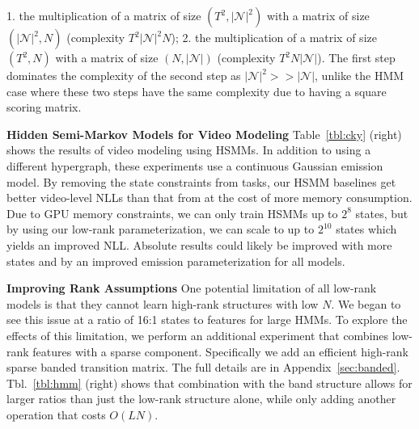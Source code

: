 \documentclass{article}
\begin{document}
1. the multiplication of a matrix of size $(T^2,|\mathcal{N}|^2)$ with a matrix of size $(|\mathcal{N}|^2, N)$ (complexity $T^2|\mathcal{N}|^2N$);
2. the multiplication of a matrix of size $(T^2,N)$ with a matrix of size $(N, |\mathcal{N}|)$ (complexity $T^2N|\mathcal{N}|$).
The first step dominates the complexity of the second step as $|\mathcal{N}|^2>>|\mathcal{N}|$, unlike the HMM case where these two steps have the same complexity due to having a square scoring matrix.

\textbf{Hidden Semi-Markov Models for Video Modeling} Table~\ref{tbl:cky} (right) shows the results of video modeling using HSMMs. In addition to using a different hypergraph, these experiments use a continuous Gaussian emission model. By removing the state constraints from tasks, our HSMM baselines get better video-level NLLs than that from \citet{fried2020learning} at the cost of more memory consumption. Due to GPU memory constraints, we can only train HSMMs up to $2^8$ states, but by using our low-rank parameterization, we can scale to up to $2^{10}$ states which yields an improved NLL. Absolute results could likely be improved with more states and by an improved emission parameterization for all models.

\textbf{Improving Rank Assumptions}
One potential limitation of all low-rank models is that they cannot learn high-rank structures with low $N$.
We began to see this issue at a ratio of 16:1 states to features for large HMMs.
To explore the effects of this limitation, we perform an additional experiment that combines low-rank features with a sparse component. Specifically we add an efficient high-rank sparse banded transition matrix. 
The full details are in Appendix~\ref{sec:banded}.
Tbl.~\ref{tbl:hmm} (right) shows that combination with the band structure allows for larger ratios than just the low-rank structure alone, while only adding another operation that costs $O(LN)$.
\end{document}
